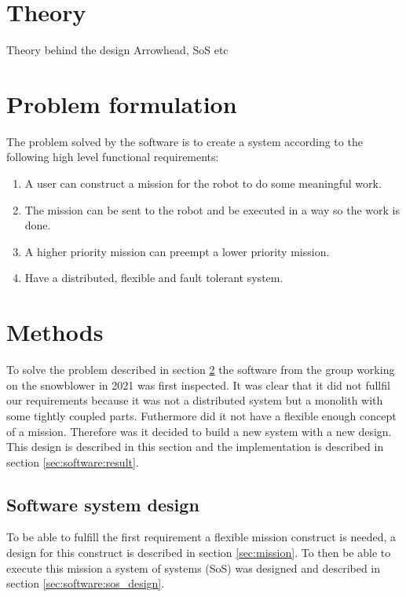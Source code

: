 \documentclass{article}
\title{}
\author{}
\date{\today}
\begin{document}
\section{Theory}
Theory behind the design Arrowhead, SoS etc

\section{Problem formulation}
\label{sec:software:problem_formulation}

The problem solved by the software is to create a system according to the following high level functional requirements:\\
\begin{enumerate}
    \item A user can construct a mission for the robot to do some meaningful work.
    \item The mission can be sent to the robot and be executed in a way so the work is done.
    \item A higher priority mission can preempt a lower priority mission.
    \item Have a distributed, flexible and fault tolerant system.
\end{enumerate}

\section{Methods}


To solve the problem described in section \ref{sec:software:problem_formulation} the software from the group working on the snowblower in 2021 was first inspected. It was clear that it did not fullfil our requirements because it was not a distributed system but a monolith with some tightly coupled parts. Futhermore did it not have a flexible enough concept of a mission. Therefore was it decided to build a new system with a new design. This design is described in this section and the implementation is described in section \ref{sec:software:result}.

\subsection{Software system design}
\label{sec:software:design}

To be able to fulfill the first requirement a flexible mission construct is needed, a design for this construct is described in section \ref{sec:mission}. To then be able to execute this mission a system of systems (SoS) was designed and described in section \ref{sec:software:sos_design}.
\end{document}
